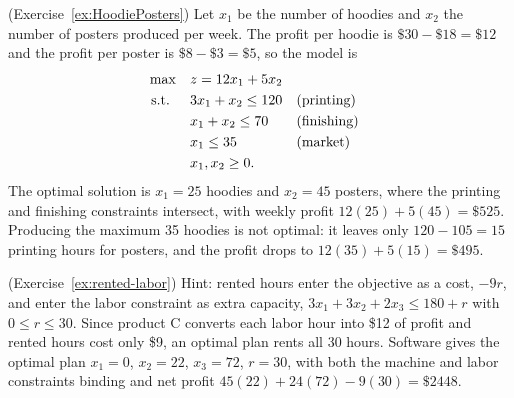 \begin{solution}(Exercise~\ref{ex:HoodiePosters})
Let $x_1$ be the number of hoodies and $x_2$ the number of posters produced per week.  The profit per hoodie is $\$30 - \$18 = \$12$ and the profit per poster is $\$8 - \$3 = \$5$, so the model is
\begin{align*}
\max \quad & z = 12x_1 + 5x_2\\
\mbox{ s.t. } \quad & 3x_1 + x_2 \leq 120 && \mbox{(printing)}\\
& x_1 + x_2 \leq 70 && \mbox{(finishing)}\\
& x_1 \leq 35 && \mbox{(market)}\\
& x_1, x_2 \geq 0.
\end{align*}
The optimal solution is $x_1 = 25$ hoodies and $x_2 = 45$ posters, where the printing and finishing constraints intersect, with weekly profit $12(25) + 5(45) = \$525$.  Producing the maximum 35 hoodies is not optimal: it leaves only $120 - 105 = 15$ printing hours for posters, and the profit drops to $12(35) + 5(15) = \$495$.
\end{solution}

\begin{solution}(Exercise~\ref{ex:rented-labor})
Hint: rented hours enter the objective as a cost, $-9r$, and enter the labor constraint as extra capacity, $3x_1 + 3x_2 + 2x_3 \leq 180 + r$ with $0 \leq r \leq 30$.  Since product C converts each labor hour into \$12 of profit and rented hours cost only \$9, an optimal plan rents all 30 hours.  Software gives the optimal plan $x_1 = 0$, $x_2 = 22$, $x_3 = 72$, $r = 30$, with both the machine and labor constraints binding and net profit $45(22) + 24(72) - 9(30) = \$2448$.
\end{solution}



